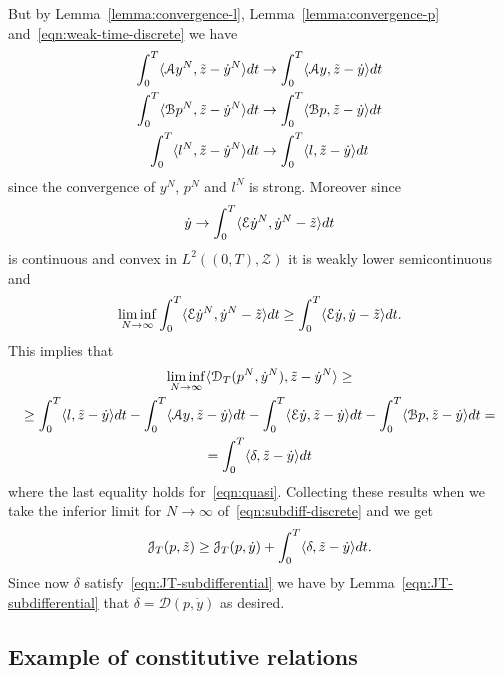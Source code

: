 But by Lemma~\ref{lemma:convergence-l}, Lemma~\ref{lemma:convergence-p} and~\eqref{eqn:weak-time-discrete} we have
\begin{gather*}
\int_0^T\langle\mathcal{A}y^N,\tilde z-\dot y^N\rangle dt\to\int_0^T\langle\mathcal{A}y,\tilde z-\dot y\rangle dt \\
\int_0^T\langle\mathcal{B}p^N,\tilde z-\dot y^N\rangle dt\to\int_0^T\langle\mathcal{B}p,\tilde z-\dot y\rangle dt \\
\int_0^T\langle l^N,\tilde z-\dot y^N\rangle dt\to\int_0^T\langle l,\tilde z-\dot y\rangle dt
\end{gather*}
since the convergence of $y^N$, $p^N$ and $l^N$ is strong. Moreover since
\[
\dot y\to\int_0^T\langle\mathcal{E}\dot y^N,\dot y^N-\tilde z\rangle dt
\]
is continuous and convex in $L^2((0,T),\mathscr{Z})$ it is weakly lower semicontinuous and
\[
\liminf_{N\to\infty}\int_0^T\langle\mathcal{E}\dot y^N,\dot y^N-\tilde z\rangle dt\ge\int_0^T\langle\mathcal{E}\dot y,\dot y-\tilde z\rangle dt.
\]
This implies that
\begin{multline*}
\liminf_{N\to\infty}\langle\mathcal{D}_T(p^N,\dot y^N),\tilde z-\dot y^N\rangle\ge\\
\ge\int_0^T\langle l,\tilde z-\dot y\rangle dt-\int_0^T\langle\mathcal{A}y,\tilde z-\dot y\rangle dt-\int_0^T\langle\mathcal{E}\dot y,\tilde z-\dot y\rangle dt-\int_0^T\langle\mathcal{B}p,\tilde z-\dot y\rangle dt=\\
=\int_0^T\langle\delta,\tilde z-\dot y\rangle dt
\end{multline*}
where the last equality holds for~\eqref{eqn:quasi}. Collecting these results when we take the inferior limit for $N\to\infty$ of~\eqref{eqn:subdiff-discrete} and we get
\[
\mathcal{J}_T(p,\tilde z)\ge\mathcal{J}_T(p,\dot y)+\int_0^T\langle\delta,\tilde z-\dot y\rangle dt.
\]
Since now $\delta$ satisfy~\eqref{eqn:JT-subdifferential} we have by Lemma~\ref{eqn:JT-subdifferential} that $\delta=\mathcal{D}(p,\dot y)$ as desired.

\subsection{Example of constitutive relations}

